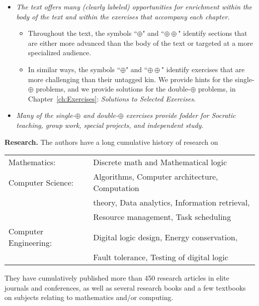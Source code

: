 \begin{itemize}
\item
{\em The text offers many (clearly labeled) opportunities for enrichment within the body of the text and within the exercises that accompany each chapter.}

  \begin{itemize}
  \item
Throughout the text, the symbols ``$\oplus$" and ``$\oplus \oplus$" identify sections that are either more advanced than the body of the text or targeted at a more specialized audience.
  \item
In similar ways, the symbols ``$\oplus$" and ``$\oplus \oplus$" identify exercises that are more challenging than their untagged kin.  We provide hints for the single-$\oplus$ problems, and we provide solutions for the double-$\oplus$ problems, in Chapter~\ref{ch:Exercises}: {\it Solutions to Selected Exercises}.
  \end{itemize}

\item
{\em 
Many of the single-$\oplus$ and double-$\oplus$ exercises provide fodder for Socratic teaching, group work, special projects, and independent study.}
\end{itemize}

\bigskip


\medskip

\noindent
{\bf Research.}
The authors have a long cumulative history of research on

\noindent \begin{tabular}{ll}
{\sc Mathematics:} &
Discrete math and Mathematical logic \\
{\sc Computer Science:} &
Algorithms, Computer architecture, Computation \\ 
   & theory, Data analytics, Information retrieval, \\
   & Resource management, Task scheduling \\
{\sc Computer Engineering:} &
Digital logic design, Energy conservation, \\
  & Fault tolerance, Testing of digital logic
\end{tabular}

\medskip

\noindent
They have cumulatively published more than 450 research articles in elite journals and conferences, as well as several research books and a few textbooks on subjects relating to
mathematics and/or computing.

